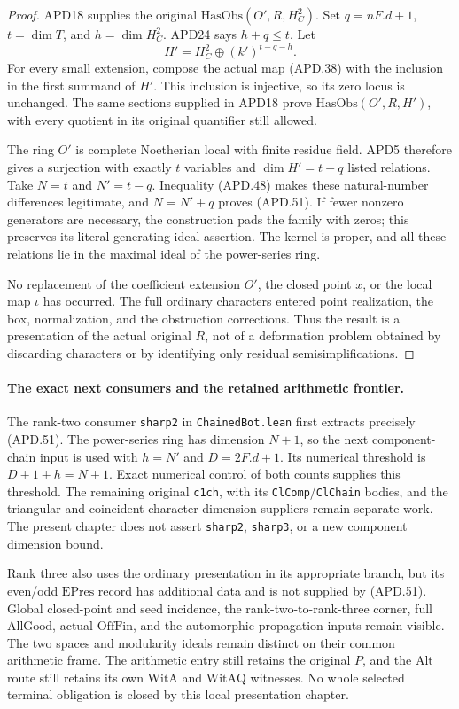 \begin{proof}
APD18 supplies the original
\(\mathrm{HasObs}(O',R,H_C^2)\).  Set
\(q=nF.d+1\), \(t=\dim T\), and
\(h=\dim H_C^2\).  APD24 says \(h+q\le t\).
Let
\[
              H'=H_C^2\oplus(k')^{t-q-h}.
\]
For every small extension, compose the actual map (APD.38)
with the inclusion in the first summand of \(H'\).  This
inclusion is injective, so its zero locus is unchanged.
The same sections supplied in APD18 prove
\(\mathrm{HasObs}(O',R,H')\), with every quotient in its
original quantifier still allowed.

The ring \(O'\) is complete Noetherian local with finite
residue field.  APD5 therefore gives a surjection with exactly
\(t\) variables and \(\dim H'=t-q\) listed relations.
Take \(N=t\) and \(N'=t-q\).  Inequality (APD.48)
makes these natural-number differences legitimate, and
\(N=N'+q\) proves (APD.51).  If fewer nonzero generators
are necessary, the construction pads the family with zeros;
this preserves its literal generating-ideal assertion.  The
kernel is proper, and all these relations lie in the maximal
ideal of the power-series ring.

No replacement of the coefficient extension \(O'\), the
closed point \(x\), or the local map \(\iota\) has occurred.
The full ordinary characters entered point realization, the
box, normalization, and the obstruction corrections.  Thus
the result is a presentation of the actual original \(R\),
not of a deformation problem obtained by discarding characters
or by identifying only residual semisimplifications.
\end{proof}

\paragraph{The exact next consumers and the retained arithmetic frontier.}
The rank-two consumer \texttt{sharp2} in
\texttt{ChainedBot.lean} first extracts precisely (APD.51).
The power-series ring has dimension \(N+1\), so the next
component-chain input is used with \(h=N'\) and
\(D=2F.d+1\).  Its numerical threshold is
\(D+1+h=N+1\).  Exact numerical control of both counts
supplies this threshold.  The remaining original
\texttt{c1ch}, with its \texttt{ClComp}/\texttt{ClChain}
bodies, and the triangular and coincident-character dimension
suppliers remain separate work.  The present chapter does not
assert \texttt{sharp2}, \texttt{sharp3}, or a new component
dimension bound.

Rank three also uses the ordinary presentation in its appropriate
branch, but its even/odd \(\mathrm{EPres}\) record has additional
data and is not supplied by (APD.51).  Global closed-point and
seed incidence, the rank-two-to-rank-three corner, full
\(\mathrm{AllGood}\), actual \(\mathrm{OffFin}\), and the
automorphic propagation inputs remain visible.  The two spaces
and modularity ideals remain distinct on their common arithmetic
frame.  The arithmetic entry still retains the original \(P\),
and the Alt route still retains its own \(\mathrm{WitA}\) and
\(\mathrm{WitAQ}\) witnesses.  No whole selected terminal
obligation is closed by this local presentation chapter.
